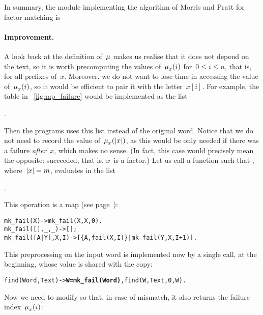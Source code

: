 In summary, the \Erlang module implementing the algorithm of Morris
and Pratt for factor matching is


\medskip

\paragraph{Improvement.}
                                   
A look back at the definition of~\(\mu\) makes us realise
that it does not depend on the text, so it is worth pre\-computing the
values of~\(\mu_{x}^{}(i)\) for~\(0 \leqslant i \leqslant n\),
that is, for all prefixes of~\(x\). Moreover, we do not want to lose
time in accessing the value of~\(\mu_{x}^{}(i)\), so it would be
efficient to pair it with the letter~\(x[i]\). For example, the table
in \fig~\vref{fig:mp_failure} would be implemented as the list
\begin{center}
\erlcode{[\{a,-1\},\{b,0\},\{a,0\},\{c,1\},\{a,0\},\{b,1\},\{a,2\},\{c,3\}]}.
\end{center}
Then the programs uses this list instead of the original word. Notice
that we do not need to record the value
of~\(\mu_{x}^{}(\lvert{x}\lvert{})\), as this would be only needed if there
was a failure \emph{after}~\(x\), which makes no sense. (In fact, this
case would precisely mean the opposite:  succeeded,
that is, \(x\)~is a factor.) Let us call  a
function such that , where~\({\lvert{x}\lvert{} = m}\),
evaluates in the list
\begin{center}
.
\end{center}
This operation is a map (see page~\pageref{maps}):
\begin{alltt}
mk_fail(X)         -> mk_fail(X,X,0).\hfill% X \emph{copied for} \(\MPfailure{x}{}{i}\)
mk_fail(   [],_,_) -> [];
mk_fail([A|Y],X,I) -> [\{A,fail(X,I)\}|mk_fail(Y,X,I+1)].
\end{alltt}
This preprocessing on the input word is implemented now by a single
call, at the beginning, whose value is shared with the copy:
\begin{alltt}
find(Word,Text) -> \textbf{W=mk_fail(Word)}, find(W,Text,0,W).
\end{alltt}
Now we need to modify  so that, in case of mismatch,
it also returns the failure index~\(\mu_{x}^{}(i)\):
